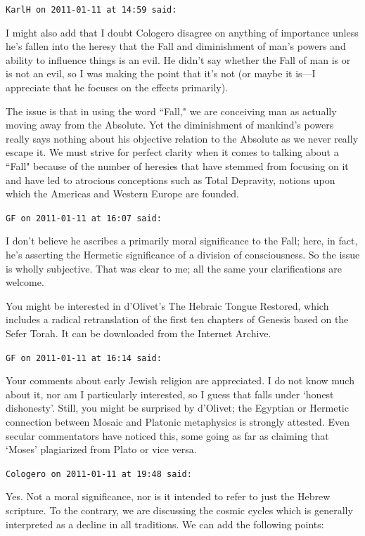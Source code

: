 \begin{footnotesize}
\begin{sffamily}
\hfill

\texttt{KarlH on 2011-01-11 at 14:59 said: }

I might also add that I doubt Cologero disagree on anything of importance unless he's fallen into the heresy that the Fall and diminishment of man's powers and ability to influence things is an evil. He didn't say whether the Fall of man is or is not an evil, so I was making the point that it's not (or maybe it is—I appreciate that he focuses on the effects primarily).

The issue is that in using the word ``Fall," we are conceiving man as actually moving away from the Absolute. Yet the diminishment of mankind's powers really says nothing about his objective relation to the Absolute as we never really escape it. We must strive for perfect clarity when it comes to talking about a ``Fall" because of the number of heresies that have stemmed from focusing on it and have led to atrocious conceptions such as Total Depravity, notions upon which the Americas and Western Europe are founded.


\hfill

\texttt{GF on 2011-01-11 at 16:07 said: }

I don't believe he ascribes a primarily moral significance to the Fall; here, in fact, he's asserting the Hermetic significance of a division of consciousness. So the issue is wholly subjective. That was clear to me; all the same your clarifications are welcome. 

You might be interested in d'Olivet's The Hebraic Tongue Restored, which includes a radical retranslation of the first ten chapters of Genesis based on the Sefer Torah. It can be downloaded from the Internet Archive.


\hfill

\texttt{GF on 2011-01-11 at 16:14 said: }

Your comments about early Jewish religion are appreciated. I do not know much about it, nor am I particularly interested, so I guess that falls under `honest dishonesty'. Still, you might be surprised by d'Olivet; the Egyptian or Hermetic connection between Mosaic and Platonic metaphysics is strongly attested. Even secular commentators have noticed this, some going as far as claiming that `Moses' plagiarized from Plato or vice versa.


\hfill

\texttt{Cologero on 2011-01-11 at 19:48 said: }

Yes. Not a moral significance, nor is it intended to refer to just the Hebrew scripture. To the contrary, we are discussing the cosmic cycles which is generally interpreted as a decline in all traditions. We can add the following points:


\end{sffamily}
\end{footnotesize}
